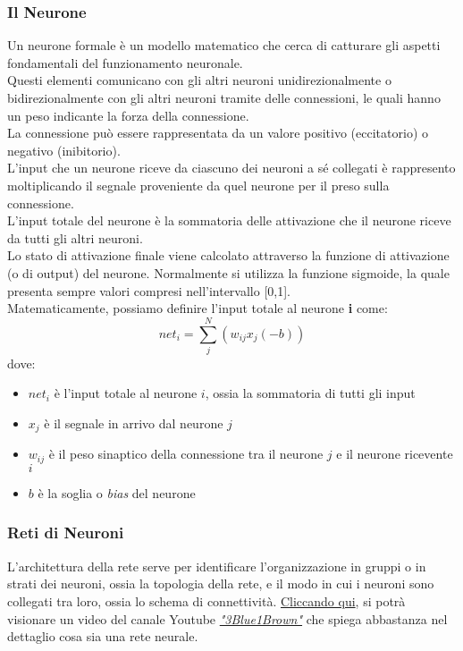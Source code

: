 \documentclass[12pt, a4paper]{article}
\begin{document}
\subsubsection{Il Neurone}
Un neurone formale è un modello matematico che cerca di catturare gli aspetti fondamentali del funzionamento neuronale.\\
Questi elementi comunicano con gli altri neuroni unidirezionalmente o bidirezionalmente con gli altri neuroni tramite delle connessioni, le quali hanno un peso indicante la forza della connessione.\\
La connessione può essere rappresentata da un valore positivo (eccitatorio) o negativo (inibitorio).\\
L'input che un neurone riceve da ciascuno dei neuroni a sé collegati è rappresento moltiplicando il segnale proveniente da quel neurone per il preso sulla connessione.\\
L'input totale del neurone è la sommatoria delle attivazione che il neurone riceve da tutti gli altri neuroni.\\
Lo stato di attivazione finale viene calcolato attraverso la funzione di attivazione (o di output) del neurone. Normalmente si utilizza la funzione sigmoide, la quale presenta sempre valori compresi nell'intervallo [0,1].\\
Matematicamente, possiamo definire l'input totale al neurone \textbf{i} come:
\[net_i=\sum_j^N(w_{ij} x_j(-b))\]
dove:
\begin{itemize}
    \item \(net_i\) è l'input totale al neurone \(i\), ossia la sommatoria di tutti gli input
    \item \(x_j\) è il segnale in arrivo dal neurone \(j\)
    \item \(w_{ij}\) è il peso sinaptico della connessione tra il neurone \(j\) e il neurone ricevente \(i\)
    \item \(b\) è la soglia o \textit{bias} del neurone
\end{itemize}

\subsubsection{Reti di Neuroni}
L'architettura della rete serve per identificare l'organizzazione in gruppi o in strati dei neuroni, ossia la topologia della rete, e il modo in cui i neuroni sono collegati tra loro, ossia lo schema di connettività.
\href{https://www.youtube.com/watch?v=aircAruvnKk}{Cliccando qui}, si potrà visionare un video del canale Youtube \href{https://www.youtube.com/channel/UCYO_jab_esuFRV4b17AJtAw}{\textit{"3Blue1Brown"}} che spiega abbastanza nel dettaglio cosa sia una rete neurale.
\end{document}

